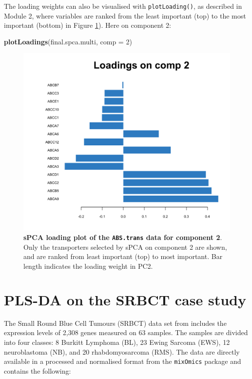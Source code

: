 \documentclass[]{book}
\newenvironment{Shaded}{\begin{snugshade}}{\end{snugshade}}
\newcommand{\DataTypeTok}[1]{\textcolor[rgb]{0.13,0.29,0.53}{#1}}
\newcommand{\DecValTok}[1]{\textcolor[rgb]{0.00,0.00,0.81}{#1}}
\newcommand{\KeywordTok}[1]{\textcolor[rgb]{0.13,0.29,0.53}{\textbf{#1}}}
\newcommand{\NormalTok}[1]{#1}
\begin{document}
The loading weights can also be visualised with \texttt{plotLoading()}, as described in Module 2, where variables are ranked from the least important (top) to the most important (bottom) in Figure \ref{fig:spca-plotLoading}). Here on component 2:

\begin{Shaded}
\begin{Highlighting}[]
\KeywordTok{plotLoadings}\NormalTok{(final.spca.multi, }\DataTypeTok{comp =} \DecValTok{2}\NormalTok{)}
\end{Highlighting}
\end{Shaded}

\begin{figure}

{\centering \includegraphics[width=0.5\linewidth]{Figures/PCA/spca-plotLoading-1} 

}

\caption{\textbf{sPCA loading plot of the \texttt{ABS.trans} data for component 2}. Only the transporters selected by sPCA on component 2 are shown, and are ranked from least important (top) to most important. Bar length indicates the loading weight in PC2.}\label{fig:spca-plotLoading}
\end{figure}



\hypertarget{plsda-srbct-case}{%
\chapter{PLS-DA on the SRBCT case study}\label{plsda-srbct-case}}

The Small Round Blue Cell Tumours (SRBCT) data set from \citep{Kha01} includes the expression levels of 2,308 genes measured on 63 samples. The samples are divided into four classes: 8 Burkitt Lymphoma (BL), 23 Ewing Sarcoma (EWS), 12 neuroblastoma (NB), and 20 rhabdomyosarcoma (RMS). The data are directly available in a processed and normalised format from the \texttt{mixOmics} package and contains the following:
\end{document}
